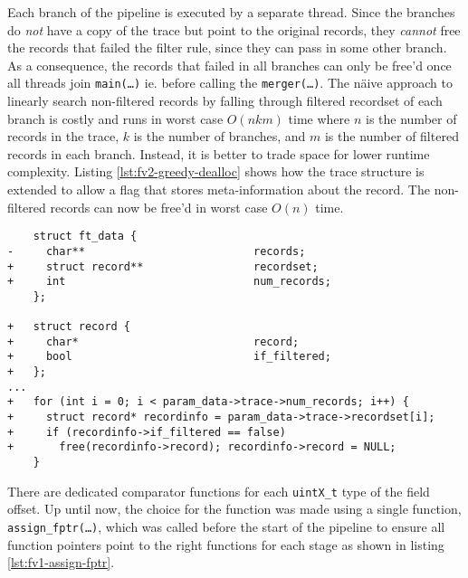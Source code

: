 Each branch of the pipeline is executed by a separate thread. Since the
branches do \emph{not} have a copy of the trace but point to the original
records, they \emph{cannot} free the records that failed the filter rule,
since they can pass in some other branch. As a consequence, the records that
failed in all branches can only be free'd once all threads join
\texttt{main(\ldots)} ie. before calling the \texttt{merger(\ldots)}. The
n\"aive approach to 
linearly search non-filtered records by falling through filtered recordset of
each branch is costly and runs in worst case $O(nkm)$ time where $n$ is the
number of records in the trace, $k$ is the number of branches, and $m$ is the
number of filtered records in each branch. Instead, it is better to trade
space for lower runtime complexity. Listing \ref{lst:fv2-greedy-dealloc} shows
how the trace structure is extended to allow a flag that stores
meta-information about the record. The non-filtered records can now be free'd
in worst case $O(n)$ time.

\begin{lstlisting}
    struct ft_data {
-     char**                          records;
+     struct record**                 recordset;
+     int                             num_records;
    };

+   struct record {
+     char*                           record;
+     bool                            if_filtered;
+   };
...
+   for (int i = 0; i < param_data->trace->num_records; i++) {
+     struct record* recordinfo = param_data->trace->recordset[i];
+     if (recordinfo->if_filtered == false)
+       free(recordinfo->record); recordinfo->record = NULL;
    }
\end{lstlisting}




There are dedicated comparator functions for each \texttt{uintX\_t} type of
the field offset. Up until now, the choice for the function was made using a
single function, \texttt{assign\_fptr(\ldots)}, which was called before the
start of the pipeline to ensure all function pointers point to the right
functions for each stage as shown in listing \ref{lst:fv1-assign-fptr}.


